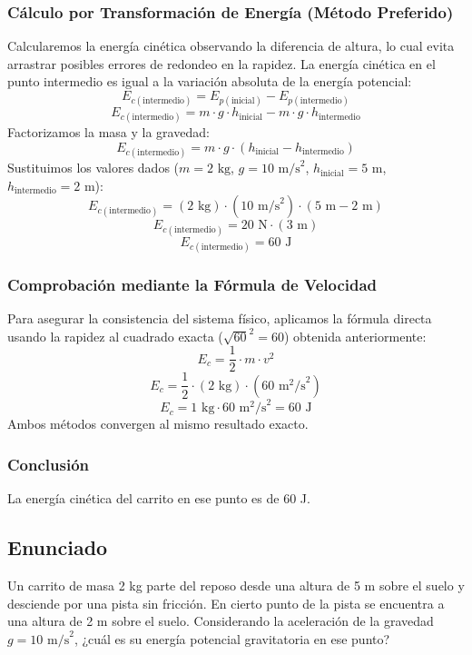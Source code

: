 \documentclass[12pt,a4paper]{article}
\begin{document}
\subsubsection*{Cálculo por Transformación de Energía (Método Preferido)}
Calcularemos la energía cinética observando la diferencia de altura, lo cual evita arrastrar posibles errores de redondeo en la rapidez.
La energía cinética en el punto intermedio es igual a la variación absoluta de la energía potencial:
$$E_{c(\text{intermedio})} = E_{p(\text{inicial})} - E_{p(\text{intermedio})}$$
$$E_{c(\text{intermedio})} = m \cdot g \cdot h_{\text{inicial}} - m \cdot g \cdot h_{\text{intermedio}}$$
Factorizamos la masa y la gravedad:
$$E_{c(\text{intermedio})} = m \cdot g \cdot (h_{\text{inicial}} - h_{\text{intermedio}})$$
Sustituimos los valores dados ($m = 2 \text{ kg}$, $g = 10 \text{ m/s}^2$, $h_{\text{inicial}} = 5 \text{ m}$, $h_{\text{intermedio}} = 2 \text{ m}$):
$$E_{c(\text{intermedio})} = (2 \text{ kg}) \cdot (10 \text{ m/s}^2) \cdot (5 \text{ m} - 2 \text{ m})$$
$$E_{c(\text{intermedio})} = 20 \text{ N} \cdot (3 \text{ m})$$
$$E_{c(\text{intermedio})} = 60 \text{ J}$$

\subsubsection*{Comprobación mediante la Fórmula de Velocidad}
Para asegurar la consistencia del sistema físico, aplicamos la fórmula directa usando la rapidez al cuadrado exacta ($\sqrt{60}^2 = 60$) obtenida anteriormente:
$$E_c = \frac{1}{2} \cdot m \cdot v^2$$
$$E_c = \frac{1}{2} \cdot (2 \text{ kg}) \cdot (60 \text{ m}^2\text{/s}^2)$$
$$E_c = 1 \text{ kg} \cdot 60 \text{ m}^2\text{/s}^2 = 60 \text{ J}$$
Ambos métodos convergen al mismo resultado exacto.

\subsubsection*{Conclusión}
La energía cinética del carrito en ese punto es de 60 J.

\newpage
\subsection*{Enunciado}
Un carrito de masa 2 kg parte del reposo desde una altura de 5 m sobre el suelo y desciende por una pista sin fricción. En cierto punto de la pista se encuentra a una altura de 2 m sobre el suelo. Considerando la aceleración de la gravedad $g = 10 \text{ m/s}^2$, ¿cuál es su energía potencial gravitatoria en ese punto?
\end{document}

